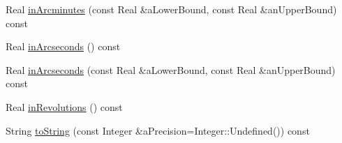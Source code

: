 \begin{DoxyCompactItemize}
Real \hyperlink{classostk_1_1math_1_1geom_1_1_angle_ae2156e2979ac231c4f35206efacd2714}{in\+Arcminutes} (const Real \&a\+Lower\+Bound, const Real \&an\+Upper\+Bound) const
\item 
Real \hyperlink{classostk_1_1math_1_1geom_1_1_angle_a12a35398676892293515576dd8164970}{in\+Arcseconds} () const
\item 
Real \hyperlink{classostk_1_1math_1_1geom_1_1_angle_a7df3afa96c4c12672c4f31d15d8ef2de}{in\+Arcseconds} (const Real \&a\+Lower\+Bound, const Real \&an\+Upper\+Bound) const
\item 
Real \hyperlink{classostk_1_1math_1_1geom_1_1_angle_a7ec84cdc26396ba4b1deeb806da5048d}{in\+Revolutions} () const
\item 
String \hyperlink{classostk_1_1math_1_1geom_1_1_angle_a900abe5e9b393bd0f701cf7ad86bb85b}{to\+String} (const Integer \&a\+Precision=Integer\+::\+Undefined()) const
\end{DoxyCompactItemize}
